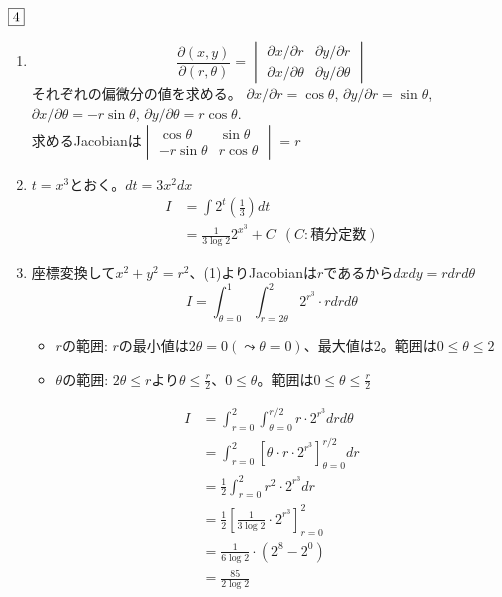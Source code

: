 \documentclass[dvipdfmx]{jsreport}
\begin{document}
\begin{souanswer} %
	$\fbox{4}$
\begin{enumerate}
	\item 
\begin{equation*}
	\frac{\partial (x, y)}{\partial (r, \theta)}= \begin{vmatrix}{\partial x}/{\partial r}& {\partial y}/{\partial r}\\ {\partial x}/{\partial \theta}& {\partial y}/{\partial \theta}\end{vmatrix}
\end{equation*}
	それぞれの偏微分の値を求める。
	${\partial x}/{\partial r}= \cos{\theta}$, 
	${\partial y}/{\partial r}= \sin{\theta}$, 
	${\partial x}/{\partial \theta}= -r\sin{\theta}$, 
	${\partial y}/{\partial \theta}= r\cos{\theta}$.\\
	求めるJacobianは$\begin{vmatrix}\cos{\theta}& \sin{\theta}\\ -r\sin{\theta}& r\cos{\theta}\end{vmatrix}= r$

	\item $t= x^3$とおく。$dt= 3x^2 dx$
\begin{align*}
	I
	&= \int 2^t \left(\frac{1}{3}\right) dt\\
	&= \frac{1}{3\log{2}} 2^{x^3}+ C\ \ (C:積分定数)
\end{align*}

	\item 座標変換して$x^2+ y^2= r^2$、(1)よりJacobianは$r$であるから$dxdy= r drd\theta$
\begin{equation*}
	I= \int_{\theta= 0}^1 \int_{r= 2\theta}^2 2^{r^3}\cdot rdrd\theta
\end{equation*}

\begin{tcolorbox}
\begin{itemize}
	\item $r$の範囲: $r$の最小値は$2\theta= 0(\leadsto \theta= 0)$、最大値は2。範囲は$0\le \theta\le 2$
	\item $\theta$の範囲: $2\theta\le r$より$\theta\le \frac{r}{2}$、$0\le \theta$。範囲は$0\le \theta\le \frac{r}{2}$
\end{itemize}
\end{tcolorbox}
\begin{align*}
	I
	&= \int_{r= 0}^2\int_{\theta= 0}^{r/2} r\cdot 2^{r^3}drd\theta\\
	&= \int_{r= 0}^2\left[\theta\cdot r\cdot 2^{r^3}\right]_{\theta= 0}^{r/2}dr\\
	&= \frac{1}{2}\int_{r= 0}^2 r^2\cdot 2^{r^3}dr\\
	&= \frac{1}{2}\left[\frac{1}{3\log{2}}\cdot 2^{r^3}\right]_{r= 0}^2\\
	&= \frac{1}{6\log{2}}\cdot (2^8- 2^0)\\
	&= \frac{85}{2\log{2}}
\end{align*}
\end{enumerate}
\end{souanswer}
\end{document}
